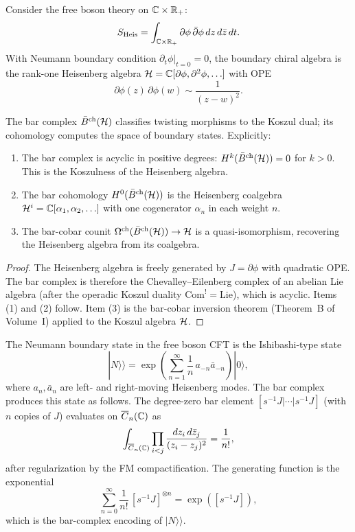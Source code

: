 \begin{theorem}
Consider the free boson theory on $\mathbb{C} \times \mathbb{R}_+$:
\[
S_{\mathrm{Heis}} = \int_{\mathbb{C} \times \mathbb{R}_+} \partial \phi \,
 \bar{\partial} \phi \, dz \, d\bar{z} \, dt.
\]
With Neumann boundary condition $\partial_t \phi|_{t=0} = 0$, the
boundary chiral algebra is the rank-one Heisenberg algebra
$\mathcal{H} = \mathbb{C}[\partial \phi, \partial^2 \phi, \ldots]$ with OPE
\[
\partial \phi(z) \, \partial \phi(w) \sim \frac{1}{(z-w)^2}.
\]

The bar complex $\bar{B}^{\mathrm{ch}}(\mathcal{H})$ classifies twisting morphisms to the Koszul dual; its cohomology computes the space of boundary states.
Explicitly:
\begin{enumerate}
\item The bar complex is acyclic in positive degrees:
 $H^k(\bar{B}^{\mathrm{ch}}(\mathcal{H})) = 0$ for $k > 0$. This is the Koszulness of the
 Heisenberg algebra.
\item The bar cohomology $H^0(\bar{B}^{\mathrm{ch}}(\mathcal{H}))$ is the Heisenberg
 coalgebra $\mathcal{H}^i = \mathbb{C}[\alpha_1, \alpha_2, \ldots]$ with one
 cogenerator $\alpha_n$ in each weight $n$.
\item The bar-cobar counit $\Omega^{\mathrm{ch}}(\bar{B}^{\mathrm{ch}}(\mathcal{H})) \to \mathcal{H}$ is a
 quasi-isomorphism, recovering the Heisenberg algebra from its
 coalgebra.
\end{enumerate}
\end{theorem}

\begin{proof}
The Heisenberg algebra is freely generated by $J = \partial \phi$ with
quadratic OPE. The bar complex is therefore the Chevalley--Eilenberg
complex of an abelian Lie algebra (after the operadic Koszul duality
$\mathrm{Com}^! = \mathrm{Lie}$), which is acyclic. Items (1) and (2)
follow. Item (3) is the bar-cobar inversion theorem
(Theorem~B of Volume~I) applied to the Koszul algebra $\mathcal{H}$.
\end{proof}

\begin{construction}
The Neumann boundary state in the free boson CFT is the Ishibashi-type
state
\[
|N\rangle\!\rangle
 = \exp\!\left(\sum_{n=1}^{\infty} \frac{1}{n}\, a_{-n} \bar{a}_{-n}
 \right) |0\rangle,
\]
where $a_n, \bar{a}_n$ are left- and right-moving Heisenberg modes.
The bar complex produces this state as follows. The degree-zero bar
element $[s^{-1}J | \cdots | s^{-1}J]$ (with $n$ copies of $J$)
evaluates on $\overline{C}_n(\mathbb{C})$ as
\[
\int_{\overline{C}_n(\mathbb{C})} \prod_{i < j}
 \frac{dz_i \, d\bar{z}_j}{(z_i - z_j)^2}
 = \frac{1}{n!},
\]
after regularization by the FM compactification. The generating
function is the exponential
\[
\sum_{n=0}^{\infty} \frac{1}{n!}\,
 [s^{-1}J]^{\otimes n}
 = \exp([s^{-1}J]),
\]
which is the bar-complex encoding of $|N\rangle\!\rangle$.
\end{construction}

